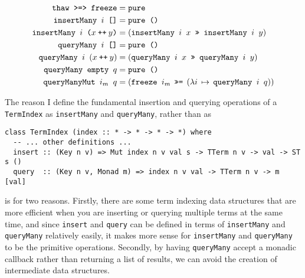 \documentclass[11pt]{report}
\newcommand{\haskell}[1]{\texttt{#1}}
\renewcommand{\mathtt}[1]{\ensuremath{\texttt{#1}}}
\newcommand{\mtt}[1]{\ensuremath{\mathtt{#1}}}     %
\begin{document}
\vspace{-1em}
\begin{align}
  \mtt{\haskell{thaw} \haskell{>=>} \haskell{freeze}}
  & = \haskell{pure}
  \label{eq:term-index-law-1} \\
  \mtt{\haskell{insertMany} $i$ \haskell{[]}}
  & = \haskell{pure ()}
  \label{eq:term-index-law-2} \\
  \mtt{\haskell{insertMany} $i$ ($x \mathbin{\haskell{++}} y$)}
  & = (\mtt{\haskell{insertMany} $i$ $x$ \haskell{>>} \haskell{insertMany} $i$ $y$})
  \label{eq:term-index-law-3} \\
  \mtt{\haskell{queryMany} $i$ \haskell{[]}}
  & = \haskell{pure ()}
  \label{eq:term-index-law-4} \\
  \mtt{\haskell{queryMany} $i$ $(x \mathbin{\haskell{++}} y)$}
  & = (\mtt{\haskell{queryMany} $i$ $x$ \haskell{>>} \haskell{queryMany} $i$ $y$})
  \label{eq:term-index-law-5} \\
  \mtt{\haskell{queryMany} \haskell{empty} $q$}
  & = \haskell{pure ()}
  \label{eq:term-index-law-6} \\
  \mtt{\haskell{queryManyMut} $i_m$ $q$}
  & = (\mtt{\haskell{freeze} $i_m$}
    \:\: \haskell{>>=} \:\:
    (\lambda i \, \mapsto \, \mtt{\haskell{queryMany} $i$ $q$}))
  \label{eq:term-index-law-7}
\end{align}

The reason I define the fundamental insertion and querying operations of a
\haskell{TermIndex} as \haskell{insertMany} and \haskell{queryMany}, rather
than as

\vspace{-0.5em}
\begin{verbatim}
class TermIndex (index :: * -> * -> * -> *) where
  -- ... other definitions ...
  insert :: (Key n v) => Mut index n v val s -> TTerm n v -> val -> ST s ()
  query  :: (Key n v, Monad m) => index n v val -> TTerm n v -> m [val]
\end{verbatim}
\vspace{0em}

is for two reasons. Firstly, there are some term indexing data structures that
are more efficient when you are inserting or querying multiple terms at the same
time, and since \haskell{insert} and \haskell{query} can be defined in terms of
\haskell{insertMany} and \haskell{queryMany} relatively easily, it makes more
sense for \haskell{insertMany} and \haskell{queryMany} to be the primitive
operations. Secondly, by having \haskell{queryMany} accept a monadic callback
rather than returning a list of results, we can avoid the creation of
intermediate data structures.
\end{document}
